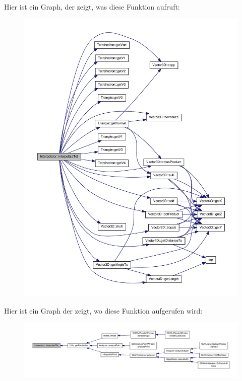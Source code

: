 Hier ist ein Graph, der zeigt, was diese Funktion aufruft\-:\nopagebreak
\begin{figure}[H]
\begin{center}
\leavevmode
\includegraphics[width=350pt]{classInterpolator_a30e714ca6dff9b5745d029f95af1420a_cgraph}
\end{center}
\end{figure}




Hier ist ein Graph der zeigt, wo diese Funktion aufgerufen wird\-:\nopagebreak
\begin{figure}[H]
\begin{center}
\leavevmode
\includegraphics[width=350pt]{classInterpolator_a30e714ca6dff9b5745d029f95af1420a_icgraph}
\end{center}
\end{figure}


